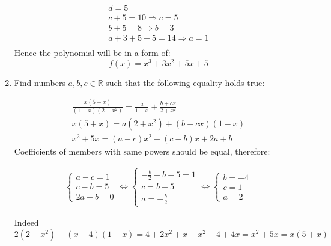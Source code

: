 \documentclass{article}
\begin{document}
\begin{enumerate}
\begin{align*}
d = 5\\
c + 5 = 10 \Rightarrow c = 5\\
b + 5 = 8 \Rightarrow b = 3\\
a + 3 + 5 + 5 = 14 \Rightarrow a = 1\\
\end{align*}
Hence the polynomial will be in a form of:
\[f(x) = x^3 + 3x^2 + 5x + 5\]



\item Find numbers $a, b, c \in \mathbb{R}$ such that the following equality holds true:

\begin{align*}
\frac{x(5+x)}{(1-x)(2+x^2)} = \frac{a}{1-x} + \frac{b + cx}{2+x^2}\\
x(5+x) = a(2+x^2) + (b + cx)(1 - x)\\
x^2 + 5x = (a - c)x^2 + (c - b)x + 2a + b
\end{align*}
Coefficients of members with same powers should be equal, therefore:

\begin{align*}
\begin{cases}
a - c = 1\\
c - b = 5\\
2a + b = 0
\end{cases} 
\iff
\begin{cases}
-\frac{b}{2} - b - 5 = 1\\
c = b + 5\\
a = -\frac{b}{2}
\end{cases}
\iff
\begin{cases}
b = -4\\
c = 1\\
a = 2
\end{cases}
\end{align*}

Indeed $2(2 + x^2) + (x - 4)(1 - x) = 4 + 2x^2 + x - x^2 - 4 + 4x = x^2 + 5x = x(5+x)$

\end{enumerate}
\end{document}
